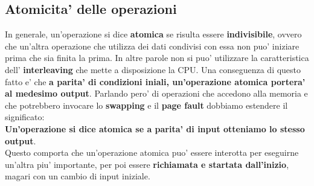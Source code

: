 \documentclass{article}
\begin{document}
    \subsection{Atomicita' delle operazioni}
        In generale, un'operazione si dice \textbf{atomica} se risulta
        essere \textbf{indivisibile}, ovvero che un'altra operazione
        che utilizza dei dati condivisi con essa non puo' iniziare prima
        che sia finita la prima.
        In altre parole non si puo' utilizzare la caratteristica dell'
        \textbf{interleaving} che mette a disposizione la CPU.
        Una conseguenza di questo fatto e' che \textbf{a parita' di condizioni iniali, un'operazione atomica portera' al medesimo
        output}.
        Parlando pero' di operazioni che accedono alla memoria e che 
        potrebbero invocare lo \textbf{swapping} e il \textbf{page fault}
        dobbiamo estendere il significato:
        \\
        \textbf{Un'operazione si dice atomica se a parita' di input otteniamo lo stesso output}.        
        \\
        Questo comporta che un'operazione atomica puo' essere interotta per eseguirne un'altra piu' importante, per poi essere \textbf{richiamata e startata dall'inizio}, magari con un cambio di input iniziale.
\end{document}

